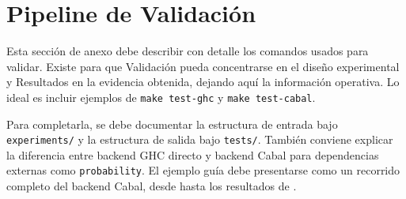 
\section{Pipeline de Validación}

Esta sección de anexo debe describir con detalle los comandos usados para validar. Existe para que Validación pueda concentrarse en el diseño experimental y Resultados en la evidencia obtenida, dejando aquí la información operativa. Lo ideal es incluir ejemplos de \texttt{make test-ghc} y \texttt{make test-cabal}.

Para completarla, se debe documentar la estructura de entrada bajo \verb|experiments/| y la estructura de salida bajo \verb|tests/|. También conviene explicar la diferencia entre backend GHC directo y backend Cabal para dependencias externas como \texttt{probability}. El ejemplo guía debe presentarse como un recorrido completo del backend Cabal, desde  hasta los resultados de .
